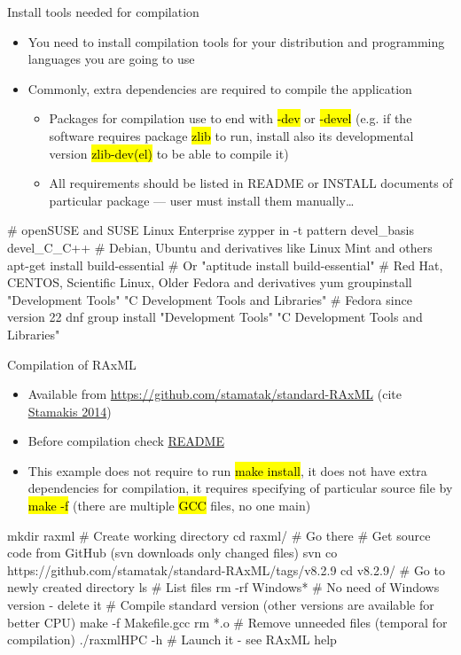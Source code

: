 \documentclass[compress, ucs, xelatex, 11pt, xcolor=svgnames,
  hyperref={
    bookmarks=true,
    unicode=true,
    colorlinks=true,
    pdftitle={Linux, command line and MetaCentrum},
    plainpages=false,
    pdfauthor={Vojtech Zeisek},
    pdfsubject={Course about use of Linux command line, writing shell scripts and using MetaCentrum of CESNET},
    pdfcreator={XeLaTeX},
    pdfkeywords={Linux, GNU, BASH, shell, command line, MetaCentrum},
    linkcolor=DarkRed,
    anchorcolor=DarkBlue,
    citecolor=Indigo,
    filecolor=NavyBlue,
    menucolor=DarkMagenta,
    urlcolor=DarkBlue,
    pdftex},
  url={hyphens, lowtilde} %
  ]{beamer}
\renewcommand{\texttt}[1]{\hl{\ttfamily #1}}
\begin{document}
\begin{frame}[fragile]{Install tools needed for compilation}
  \begin{itemize}
    \item You need to install compilation tools for your distribution and programming languages you are going to use
    \item Commonly, extra dependencies are required to compile the application
    \begin{itemize}
      \item Packages for compilation use to end with \texttt{-dev} or \texttt{-devel} (e.g. if the software requires package \texttt{zlib} to run, install also its developmental version \texttt{zlib-dev(el)} to be able to compile it)
      \item All requirements should be listed in README or INSTALL documents of particular package --- user must install them manually\ldots
    \end{itemize}
  \end{itemize}
  \begin{bashcode}
    # openSUSE and SUSE Linux Enterprise
    zypper in -t pattern devel_basis devel_C_C++
    # Debian, Ubuntu and derivatives like Linux Mint and others
    apt-get install build-essential # Or "aptitude install build-essential"
    # Red Hat, CENTOS, Scientific Linux, Older Fedora and derivatives
    yum groupinstall "Development Tools" "C Development Tools and Libraries"
    # Fedora since version 22
    dnf group install "Development Tools" "C Development Tools and Libraries"
  \end{bashcode}
\end{frame}

\begin{frame}[fragile]{Compilation of RAxML}
  \begin{itemize}
    \item Available from \url{https://github.com/stamatak/standard-RAxML} (cite \href{https://academic.oup.com/bioinformatics/article/30/9/1312/238053}{Stamakis 2014})
    \item Before compilation check \href{https://github.com/stamatak/standard-RAxML/blob/master/README}{README}
    \item This example does not require to run \texttt{make install}, it does not have extra dependencies for compilation, it requires specifying of particular source file by \texttt{make -f} (there are multiple \texttt{GCC} files, no one main)
  \end{itemize}
  \begin{bashcode}
    mkdir raxml # Create working directory
    cd raxml/ # Go there
    # Get source code from GitHub (svn downloads only changed files)
    svn co https://github.com/stamatak/standard-RAxML/tags/v8.2.9
    cd v8.2.9/ # Go to newly created directory
    ls # List files
    rm -rf Windows* # No need of Windows version - delete it
    # Compile standard version (other versions are available for better CPU)
    make -f Makefile.gcc
    rm *.o # Remove unneeded files (temporal for compilation)
    ./raxmlHPC -h # Launch it - see RAxML help
  \end{bashcode}
\end{frame}
\end{document}
